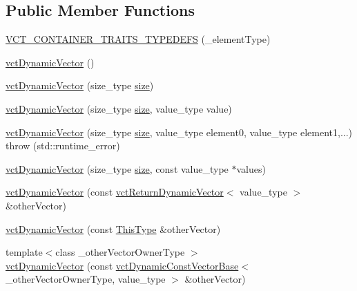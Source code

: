 \subsection*{Public Member Functions}
\begin{DoxyCompactItemize}
\item 
\hyperlink{classvct_dynamic_vector_aa0b0fe497bd9e6b7e96d1c085922618c}{V\+C\+T\+\_\+\+C\+O\+N\+T\+A\+I\+N\+E\+R\+\_\+\+T\+R\+A\+I\+T\+S\+\_\+\+T\+Y\+P\+E\+D\+E\+F\+S} (\+\_\+element\+Type)
\item 
\hyperlink{classvct_dynamic_vector_ab0d22db1d7488bea07b8524c544e3419}{vct\+Dynamic\+Vector} ()
\item 
\hyperlink{classvct_dynamic_vector_adad179fb15ce3fd0a95eae0687d7deb4}{vct\+Dynamic\+Vector} (size\+\_\+type \hyperlink{classvct_dynamic_const_vector_base_a79950d8cced7fd4e790d9ac2ca1c43a7}{size})
\item 
\hyperlink{classvct_dynamic_vector_abb80c17e617bd04190f6b399bd21c8f7}{vct\+Dynamic\+Vector} (size\+\_\+type \hyperlink{classvct_dynamic_const_vector_base_a79950d8cced7fd4e790d9ac2ca1c43a7}{size}, value\+\_\+type value)
\item 
\hyperlink{classvct_dynamic_vector_ac30415fdd822ea5e41023f44cabb19c9}{vct\+Dynamic\+Vector} (size\+\_\+type \hyperlink{classvct_dynamic_const_vector_base_a79950d8cced7fd4e790d9ac2ca1c43a7}{size}, value\+\_\+type element0, value\+\_\+type element1,...)  throw (std\+::runtime\+\_\+error)
\item 
\hyperlink{classvct_dynamic_vector_a765ad3982ec6a04c0a05fe7ecb71e3e7}{vct\+Dynamic\+Vector} (size\+\_\+type \hyperlink{classvct_dynamic_const_vector_base_a79950d8cced7fd4e790d9ac2ca1c43a7}{size}, const value\+\_\+type $\ast$values)
\item 
\hyperlink{classvct_dynamic_vector_a1985d60230fad1b87c021077ef4da997}{vct\+Dynamic\+Vector} (const \hyperlink{classvct_return_dynamic_vector}{vct\+Return\+Dynamic\+Vector}$<$ value\+\_\+type $>$ \&other\+Vector)
\item 
\hyperlink{classvct_dynamic_vector_ab0fa5c2ea18e3546b8936c219acce8a6}{vct\+Dynamic\+Vector} (const \hyperlink{classvct_dynamic_const_vector_base_a39da273523717f678f54d3321ebca3dd}{This\+Type} \&other\+Vector)
\item 
{\footnotesize template$<$class \+\_\+other\+Vector\+Owner\+Type $>$ }\\\hyperlink{classvct_dynamic_vector_a713a3a224d3f6cc55190c1ff7abb720e}{vct\+Dynamic\+Vector} (const \hyperlink{classvct_dynamic_const_vector_base}{vct\+Dynamic\+Const\+Vector\+Base}$<$ \+\_\+other\+Vector\+Owner\+Type, value\+\_\+type $>$ \&other\+Vector)

\end{DoxyCompactItemize}
